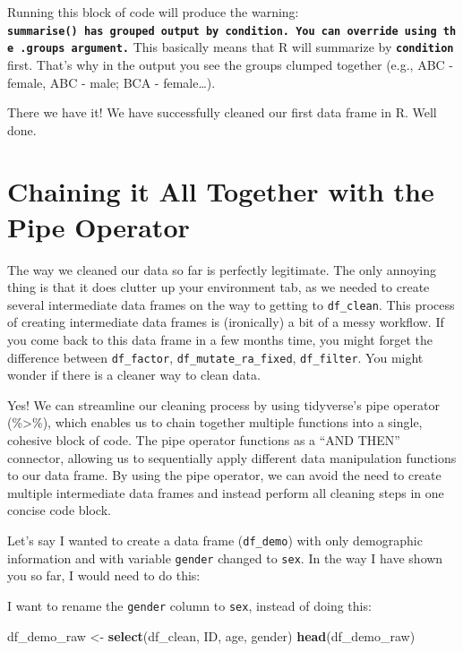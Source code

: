 \documentclass[
]{book}
\newenvironment{Shaded}{\begin{snugshade}}{\end{snugshade}}
\newcommand{\FunctionTok}[1]{\textcolor[rgb]{0.13,0.29,0.53}{\textbf{#1}}}
\newcommand{\NormalTok}[1]{#1}
\newcommand{\OtherTok}[1]{\textcolor[rgb]{0.56,0.35,0.01}{#1}}
\begin{document}
Running this block of code will produce the warning: \textbf{\texttt{summarise()\ has\ grouped\ output\ by\ \textquotesingle{}condition\textquotesingle{}.\ You\ can\ override\ using\ the\ .groups\ argument.}} This basically means that R will summarize by \textbf{\texttt{condition}} first. That's why in the output you see the groups clumped together (e.g., ABC - female, ABC - male; BCA - female\ldots).

There we have it! We have successfully cleaned our first data frame in R. Well done.

\hypertarget{chaining-it-all-together-with-the-pipe-operator}{%
\section{Chaining it All Together with the Pipe Operator}\label{chaining-it-all-together-with-the-pipe-operator}}

The way we cleaned our data so far is perfectly legitimate. The only annoying thing is that it does clutter up your environment tab, as we needed to create several intermediate data frames on the way to getting to \texttt{df\_clean}. This process of creating intermediate data frames is (ironically) a bit of a messy workflow. If you come back to this data frame in a few months time, you might forget the difference between \texttt{df\_factor}, \texttt{df\_mutate\_ra\_fixed}, \texttt{df\_filter}. You might wonder if there is a cleaner way to clean data.

Yes! We can streamline our cleaning process by using tidyverse's pipe operator (\%\textgreater\%), which enables us to chain together multiple functions into a single, cohesive block of code. The pipe operator functions as a ``AND THEN'' connector, allowing us to sequentially apply different data manipulation functions to our data frame. By using the pipe operator, we can avoid the need to create multiple intermediate data frames and instead perform all cleaning steps in one concise code block.

Let's say I wanted to create a data frame (\texttt{df\_demo}) with only demographic information and with variable \texttt{gender} changed to \texttt{sex}. In the way I have shown you so far, I would need to do this:

I want to rename the \texttt{gender} column to \texttt{sex}, instead of doing this:

\begin{Shaded}
\begin{Highlighting}[]
\NormalTok{df\_demo\_raw }\OtherTok{\textless{}{-}} \FunctionTok{select}\NormalTok{(df\_clean, ID, age, gender)}
\FunctionTok{head}\NormalTok{(df\_demo\_raw)}
\end{Highlighting}
\end{Shaded}
\end{document}

